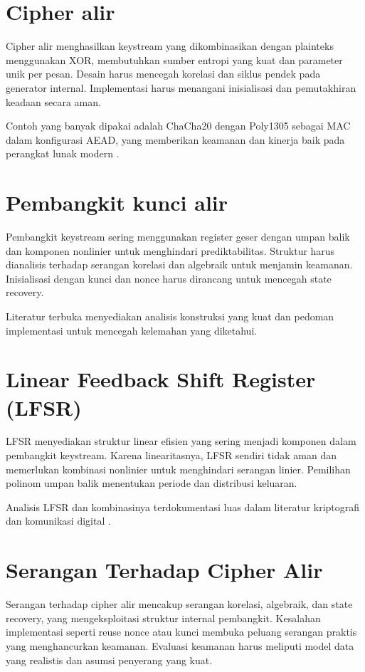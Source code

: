 \documentclass[../main.tex]{subfiles}
\begin{document}
\section{Cipher alir}
Cipher alir menghasilkan keystream yang dikombinasikan dengan plainteks menggunakan XOR, membutuhkan sumber entropi yang kuat dan parameter unik per pesan. Desain harus mencegah korelasi dan siklus pendek pada generator internal. Implementasi harus menangani inisialisasi dan pemutakhiran keadaan secara aman.

Contoh yang banyak dipakai adalah ChaCha20 dengan Poly1305 sebagai MAC dalam konfigurasi AEAD, yang memberikan keamanan dan kinerja baik pada perangkat lunak modern \parencite{rfc8439}.

\section{Pembangkit kunci alir}
Pembangkit keystream sering menggunakan register geser dengan umpan balik dan komponen nonlinier untuk menghindari prediktabilitas. Struktur harus dianalisis terhadap serangan korelasi dan algebraik untuk menjamin keamanan. Inisialisasi dengan kunci dan nonce harus dirancang untuk mencegah state recovery.

Literatur terbuka menyediakan analisis konstruksi yang kuat dan pedoman implementasi untuk mencegah kelemahan yang diketahui.

\section{Linear Feedback Shift Register (LFSR)}
LFSR menyediakan struktur linear efisien yang sering menjadi komponen dalam pembangkit keystream. Karena linearitasnya, LFSR sendiri tidak aman dan memerlukan kombinasi nonlinier untuk menghindari serangan linier. Pemilihan polinom umpan balik menentukan periode dan distribusi keluaran.

Analisis LFSR dan kombinasinya terdokumentasi luas dalam literatur kriptografi dan komunikasi digital \parencite{menezes1996handbook}.

\section{Serangan Terhadap Cipher Alir}
Serangan terhadap cipher alir mencakup serangan korelasi, algebraik, dan state recovery, yang mengeksploitasi struktur internal pembangkit. Kesalahan implementasi seperti reuse nonce atau kunci membuka peluang serangan praktis yang menghancurkan keamanan. Evaluasi keamanan harus meliputi model data yang realistis dan asumsi penyerang yang kuat.
\end{document}
